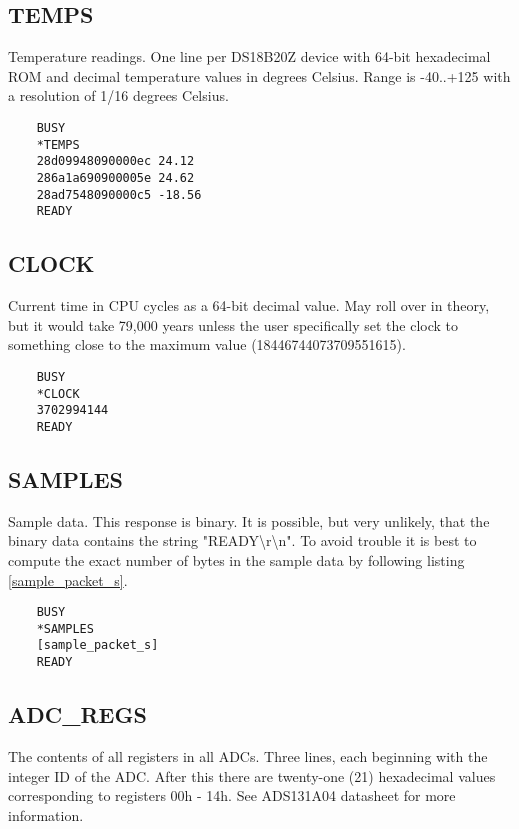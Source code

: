 \documentclass{article}
\begin{document}
\subsection{TEMPS}

Temperature readings.
One line per DS18B20Z device with 64-bit hexadecimal ROM and decimal temperature values in degrees Celsius.
Range is -40..+125 with a resolution of 1/16 degrees Celsius.

\begin{lstlisting}
    BUSY
    *TEMPS
    28d09948090000ec 24.12
    286a1a690900005e 24.62
    28ad7548090000c5 -18.56
    READY
\end{lstlisting}

\subsection{CLOCK}

Current time in CPU cycles as a 64-bit decimal value.
May roll over in theory, but it would take 79,000 years unless the user
specifically set the clock to something close to the maximum value (18446744073709551615).

\begin{lstlisting}
    BUSY
    *CLOCK
    3702994144
    READY
\end{lstlisting}

\subsection{SAMPLES}

Sample data.
This response is binary.
It is possible, but very unlikely, that the binary data contains the string "READY{\textbackslash}r{\textbackslash}n".
To avoid trouble it is best to compute the exact number of bytes in the sample data by following listing \vref{sample_packet_s}.

\begin{lstlisting}
    BUSY
    *SAMPLES
    [sample_packet_s]
    READY
\end{lstlisting}

\subsection{ADC\_REGS}

The contents of all registers in all ADCs.
Three lines, each beginning with the integer ID of the ADC.
After this there are twenty-one (21) hexadecimal values corresponding to registers 00h - 14h.
See ADS131A04 datasheet for more information.
\end{document}
